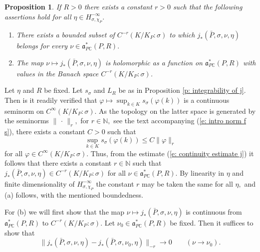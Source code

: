 \documentclass[12pt,a4paper]{article}
\newtheorem{Prop}[Thm]{Proposition}
\newenvironment{prop}[0]{\begin{Prop}\noindent}%
{\end{Prop}}
\def\proof{\par\noindent{\it Proof.}{\ }{\ }}
\def\qquad{\quad\quad}
\def\itema{\vspace{-1mm}\item[{\rm (a)}]}
\def\itemb{\item[{\rm (b)}]}
\def\msy#1{{\mathbb #1}}
\def\C{{\msy C}}
\def\N{{\msy N}}
\def\gf{\varphi}
\def\gs{\sigma}
\def\got#1{\mathfrak #1}
\def\fa{{\got a}}
\def\to{\rightarrow}
\def\iC{{\scriptscriptstyle \C}}
\numberwithin{Thm}{section}
\numberwithin{equation}{section}
\def\dotvar{\, \cdot\,}
\def\faPdc{{\fa_{P\iC}^*}}
\numberwithin{equation}{section}
\def\faPdc{\fa_{P\iC}^*}
\def\cchi{\chi}
\def\gsP{\gs}%
\begin{document}
 \begin{prop}
\label{p: holomorphy j in dominant region}
If $R > 0$ there exists a constant $r > 0$ such that the following assertions hold for all 
$\eta \in H_{\gs, \cchi_P}^{-\infty}.$
\begin{enumerate} 
\itema
There exists a bounded subset of $C^{-r}(K/K_P:\gsP)$ to which 
$j_*(\bar P, \gs, \nu, \eta)$ belongs 
for every  $\nu \in \faPdc(P,R).$ 
\itemb
The map $\nu \mapsto j_*(\bar P, \gs, \nu, \eta)$ 
is holomorphic as a function on $\faPdc(P,R)$ with values in the Banach space
 $C^{-r}(K/K_P: \gsP)$. 
 \end{enumerate} 
\end{prop}

\proof
Let $\eta $ and $R$ be fixed. Let $s_\gs $ and $L_R$ be as in Proposition \ref{p: integrability of j}.
Then is it readily verified that $ \gf \mapsto \sup_{k\in K} s_\gs(\gf(k))$ is a continuous seminorm 
on $C^\infty(K/K_P:\gsP).$ As the topology on the latter space is generated by the seminorms
$\|\dotvar\|_{r},$ for $r \in \N,$ see 
% 
the text accompanying (\ref{e:  intro norm f s}), 
there exists a constant $C >0$ such that 
\begin{equation}
\label{e: estimate sup s gs gf}
\sup_{k\in K} s_\gs(\gf(k)) \leq C \|\gf\|_r
\end{equation}
for all $\gf \in C^\infty(K/K_P:\gsP).$ Thus, from the estimate (\ref{e: continuity estimate j}) it follows that  there exists a constant $r \in \N$ such that $j_*(\bar P, \gs, \nu, \eta) \in 
C^{-r}(K/K_P:\gsP)$ for all $\nu \in \faPdc(P,R).$ By linearity in $\eta$ and finite dimensionality of  
$H_{\gs, \cchi_P}^{-\infty}$ the constant $r$ may be taken the same for all $\eta,$ 
and (a) follows, with the mentioned boundedness. 

For (b) we will first show that the map $\nu \mapsto j_*(\bar P, \gs, \nu, \eta)$ 
is continuous from $\faPdc(P,R)$ to $C^{-r}(K/K_P:\gsP).$ 
Let $\nu_0 \in \faPdc(P,R)$ be fixed. Then it suffices to show that
\begin{equation}
\label{e: limit j star for nu}
\| j_*(\bar P, \gs, \nu, \eta) - j_*(\bar P, \gs, \nu_0, \eta) \|_{-r} \to 0 \qquad (\nu \to \nu_0).
\end{equation}
\end{document}
